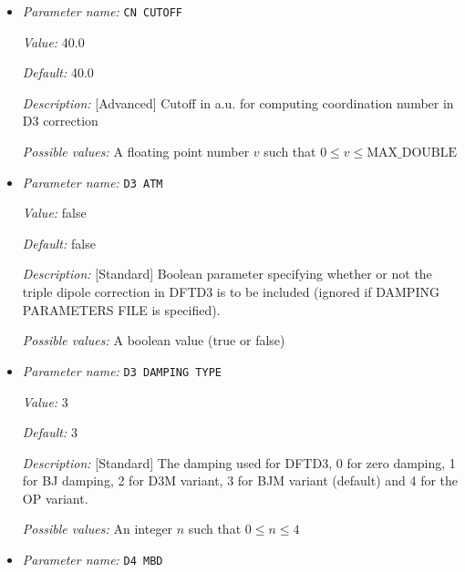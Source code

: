 \begin{itemize}
\item {\it Parameter name:} {\tt CN CUTOFF}
\label{parameters:DFT functional parameters/Dispersion Correction/CN CUTOFF}
\label{parameters:DFT_20functional_20parameters/Dispersion_20Correction/CN_20CUTOFF}


{\it Value:} 40.0


{\it Default:} 40.0


{\it Description:} [Advanced] Cutoff in a.u. for computing coordination number in D3 correction


{\it Possible values:} A floating point number $v$ such that $0 \leq v \leq \text{MAX\_DOUBLE}$
\item {\it Parameter name:} {\tt D3 ATM}
\label{parameters:DFT functional parameters/Dispersion Correction/D3 ATM}
\label{parameters:DFT_20functional_20parameters/Dispersion_20Correction/D3_20ATM}


{\it Value:} false


{\it Default:} false


{\it Description:} [Standard] Boolean parameter specifying whether or not the triple dipole correction in DFTD3 is to be included (ignored if DAMPING PARAMETERS FILE is specified).


{\it Possible values:} A boolean value (true or false)
\item {\it Parameter name:} {\tt D3 DAMPING TYPE}
\label{parameters:DFT functional parameters/Dispersion Correction/D3 DAMPING TYPE}
\label{parameters:DFT_20functional_20parameters/Dispersion_20Correction/D3_20DAMPING_20TYPE}


{\it Value:} 3


{\it Default:} 3


{\it Description:} [Standard] The damping used for DFTD3, 0 for zero damping, 1 for BJ damping, 2 for D3M variant, 3 for BJM variant (default) and 4 for the OP variant.


{\it Possible values:} An integer $n$ such that $0\leq n \leq 4$
\item {\it Parameter name:} {\tt D4 MBD}
\label{parameters:DFT functional parameters/Dispersion Correction/D4 MBD}
\label{parameters:DFT_20functional_20parameters/Dispersion_20Correction/D4_20MBD}



\end{itemize}
